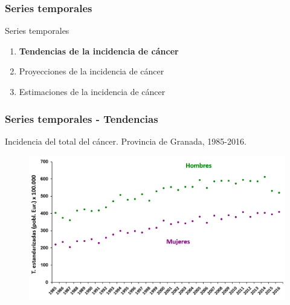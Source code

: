 \documentclass{beamer}
\begin{document}

\begin{frame}\frametitle{Series temporales}
	\begin{block}{Series temporales}
		\begin{enumerate}
			\item \textbf{Tendencias de la incidencia de cáncer}\\[2ex]
			\item Proyecciones de la incidencia de cáncer\\[2ex]
			\item Estimaciones de la incidencia de cáncer\\[2ex]
		\end{enumerate}
	\end{block}
\end{frame}


\begin{frame}\frametitle{Series temporales - Tendencias}
	\centering
	Incidencia del total del cáncer. Provincia de Granada, 1985-2016.
	\begin{figure}
		\centering
		\includegraphics[width=\textwidth]{images/tendencias0.png}
	\end{figure}
\end{frame}

\end{document}
